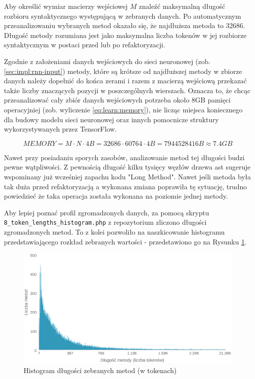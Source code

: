 \documentclass[12pt]{report}
\begin{document}
Aby określić wymiar macierzy wejściowej $M$ znaleźć maksymalną długość rozbioru syntaktycznego występującą w zebranych danych. Po automatycznym przeanalizowaniu wybranych metod okazało się, że najdłuższa metoda to 32686. Długość metody rozumiana jest jako maksymalna liczba tokenów w jej rozbiorze syntaktycznym w postaci przed lub po refaktoryzacji.

Zgodnie z założeniami danych wejściowych do sieci neuronowej (zob. \ref{sec:impl:rnn-input}) metody, które są krótsze od najdłuższej metody w zbiorze danych należy dopełnić do końca zerami i razem z macierzą wejściową przekazać także liczby znaczących pozycji w poszczególnych wierszach. Oznacza to, że chcąc przeanalizować cały zbiór danych wejściowych potrzeba około 8GB pamięci operacyjniej (zob. wyliczenie \ref{eq:learn:memory}), nie licząc miejsca koniecznego dla budowy modelu sieci neuronowej oraz innych pomocnicze struktury wykorzystywanych przez TensorFlow.

\begin{equation} \label{eq:learn:memory}
MEMORY = M \cdot N \cdot 4B = 32686 \cdot 60764 \cdot 4B = 7944528416B \approx 7.4GB
\end{equation}

Nawet przy posiadaniu sporych zasobów, analizowanie metod tej długości budzi pewne wątpliwości. Z pewnością długość kilku tysięcy węzłów drzewa \gls{ast} sugeruje wspominany już wcześniej zapachu kodu "Long Method". Nawet jeśli metoda była tak duża przed refaktoryzacją a wykonana zmiana poprawiła tę sytuację, trudno powiedzieć że taka operacja została wykonana na poziomie jednej metody.

Aby lepiej poznać profil zgromadzonych danych, za pomocą skryptu \texttt{8\_token\_lengths\_histogram.php} z repozytorium \cite{fracz:refactor-extractor} zliczono długości zgromadzonych metod. To z kolei pozwoliło na naszkicowanie histogramu przedstawiającego rozkład zebranych wartości - przedstawiono go na Rysunku \ref{fig:learn:histogram-dlugosci}.

\begin{figure}
\centering
\includegraphics[width=\textwidth]{learn/input-histogram.eps}
\caption{Histogram długości zebranych metod (w tokenach)}
\label{fig:learn:histogram-dlugosci}
\end{figure}
\end{document}

